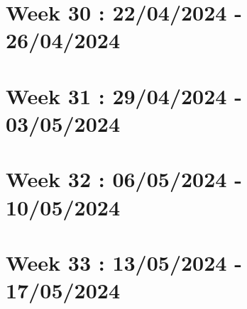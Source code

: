 \documentclass[french]{article}
\begin{document}
	\section{Week 30 : 22/04/2024 - 26/04/2024}
	

	\section{Week 31 : 29/04/2024 - 03/05/2024}
	

	\section{Week 32 : 06/05/2024 - 10/05/2024}
	

	\section{Week 33 : 13/05/2024 - 17/05/2024}
	
\end{document}
